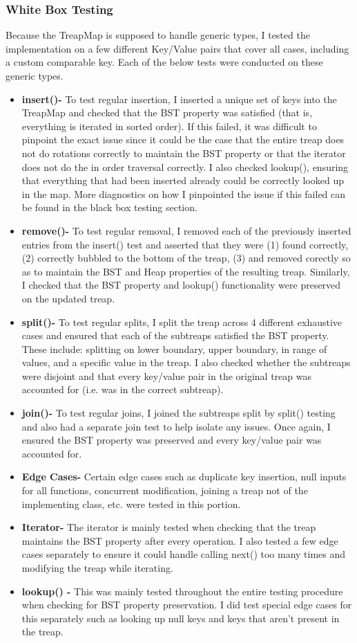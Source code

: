 \documentclass[11pt]{article}
\begin{document}
\subsubsection*{White Box Testing}
Because the TreapMap is supposed to handle generic types, I tested the implementation on a few different Key/Value pairs that cover all cases, including a custom comparable key. Each of the below tests were conducted on these generic types.
\begin{itemize}
\item \textbf{insert()-} To test regular insertion, I inserted a unique set of keys into the TreapMap and checked that the BST property was satisfied (that is, everything is iterated in sorted order). If this failed, it was difficult to pinpoint the exact issue since it could be the case that the entire treap does not do rotations correctly to maintain the BST property or that the iterator does not do the in order traversal correctly. I also checked lookup(), ensuring that everything that had been inserted already could be correctly looked up in the map. More diagnostics on how I pinpointed the issue if this failed can be found in the black box testing section.
\item \textbf{remove()-} To test regular removal, I removed each of the previously inserted entries from the insert() test and asserted that they were (1) found correctly, (2) correctly bubbled to the bottom of the treap, (3) and removed corectly so as to maintain the BST and Heap properties of the resulting treap. Similarly, I checked that the BST property and lookup() functionality were preserved on the updated treap.
\item \textbf{split()-} To test regular splits, I split the treap across 4 different exhaustive cases and ensured that each of the subtreaps satisfied the BST property. These include: splitting on lower boundary, upper boundary, in range of values, and a specific value in the treap. I also checked whether the subtreaps were disjoint and that every key/value pair in the original treap was accounted for (i.e. was in the correct subtreap). 
\item \textbf{join()-} To test regular joins, I joined the subtreaps split by split() testing and also had a separate join test to help isolate any issues. Once again, I ensured the BST property was preserved and every key/value pair was accounted for.
\item \textbf{Edge Cases-} Certain edge cases such as duplicate key insertion, null inputs for all functions, concurrent modification, joining a treap not of the implementing class, etc. were tested in this portion. 
\item \textbf{Iterator-} The iterator is mainly tested when checking that the treap maintains the BST property after every operation. I also tested a few edge cases separately to ensure it could handle calling next() too many times and modifying the treap while iterating.
\item \textbf{lookup() -} This was mainly tested throughout the entire testing procedure when checking for BST property preservation. I did test special edge cases for this separately such as looking up null keys and keys that aren't present in the treap.
\end{itemize}
\end{document}
